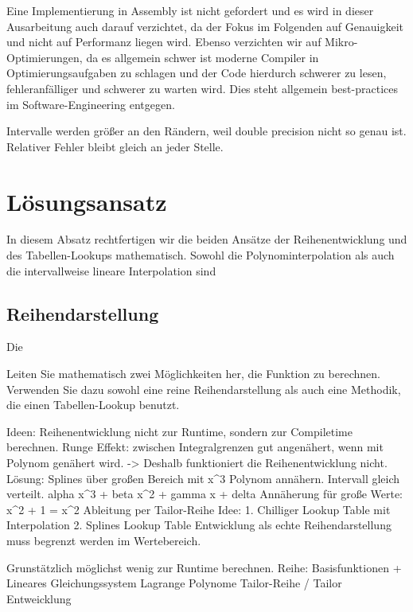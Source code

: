 \documentclass[course=erap] {aspdoc}
\begin{document}
    Eine Implementierung in Assembly ist nicht gefordert und es wird in dieser Ausarbeitung auch darauf verzichtet, da der Fokus im Folgenden auf Genauigkeit und nicht auf Performanz liegen wird.
    Ebenso verzichten wir auf Mikro-Optimierungen, da es allgemein schwer ist moderne Compiler in Optimierungsaufgaben zu schlagen und der Code hierdurch schwerer zu lesen, fehleranfälliger und schwerer zu warten wird.
    Dies steht allgemein best-practices im Software-Engineering entgegen.

    Intervalle werden größer an den Rändern, weil double precision nicht so genau ist.
    Relativer Fehler bleibt gleich an jeder Stelle.


    \section{Lösungsansatz}

    In diesem Absatz rechtfertigen wir die beiden Ansätze der Reihenentwicklung und des Tabellen-Lookups mathematisch.
    Sowohl die Polynominterpolation als auch die intervallweise lineare Interpolation sind 

    \subsection{Reihendarstellung}
    Die 





    Leiten Sie mathematisch zwei Möglichkeiten her, die Funktion zu berechnen.
    Verwenden Sie dazu sowohl eine reine Reihendarstellung als auch eine Methodik, die einen Tabellen-Lookup benutzt.

    Ideen: Reihenentwicklung nicht zur Runtime, sondern zur Compiletime berechnen.
    Runge Effekt: zwischen Integralgrenzen gut angenähert, wenn mit Polynom genähert wird. -> Deshalb funktioniert die Reihenentwicklung nicht.
    Lösung: Splines über großen Bereich mit x^3 Polynom annähern. Intervall gleich verteilt. alpha x^3 + beta x^2 + gamma x + delta
    Annäherung für große Werte: x^2 + 1 = x^2
    Ableitung per Tailor-Reihe
    Idee: 1. Chilliger Lookup Table mit Interpolation 2. Splines Lookup Table
    Entwicklung als echte Reihendarstellung muss begrenzt werden im Wertebereich.

    Grunstätzlich möglichst wenig zur Runtime berechnen.
    Reihe: Basisfunktionen + Lineares Gleichungssystem
    Lagrange Polynome
    Tailor-Reihe / Tailor Entweicklung
\end{document}
